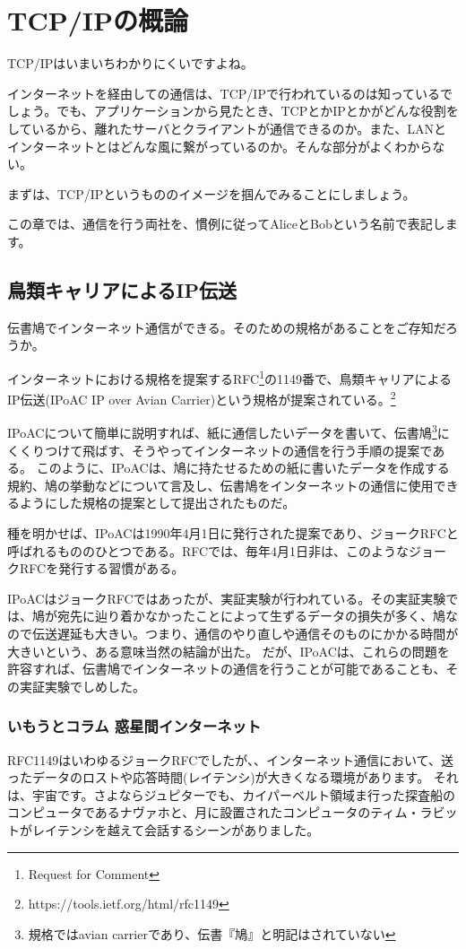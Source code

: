 \chapter{TCP/IPの概論}

TCP/IPはいまいちわかりにくいですよね。

インターネットを経由しての通信は、TCP/IPで行われているのは知っているでしょう。でも、アプリケーションから見たとき、TCPとかIPとかがどんな役割をしているから、離れたサーバとクライアントが通信できるのか。また、LANとインターネットとはどんな風に繋がっているのか。そんな部分がよくわからない。

まずは、TCP/IPというもののイメージを掴んでみることにしましょう。

この章では、通信を行う両社を、慣例に従ってAliceとBobという名前で表記します。

\section{鳥類キャリアによるIP伝送}

伝書鳩でインターネット通信ができる。そのための規格があることをご存知だろうか。

インターネットにおける規格を提案するRFC\footnote{Request for Comment}の1149番で、鳥類キャリアによるIP伝送(IPoAC IP over Avian Carrier)という規格が提案されている。\footnote{https://tools.ietf.org/html/rfc1149}

IPoACについて簡単に説明すれば、紙に通信したいデータを書いて、伝書鳩\footnote{規格ではavian carrierであり、伝書『鳩』と明記はされていない}にくくりつけて飛ばす、そうやってインターネットの通信を行う手順の提案である。
このように、IPoACは、鳩に持たせるための紙に書いたデータを作成する規約、鳩の挙動などについて言及し、伝書鳩をインターネットの通信に使用できるようにした規格の提案として提出されたものだ。

種を明かせば、IPoACは1990年4月1日に発行された提案であり、ジョークRFCと呼ばれるもののひとつである。RFCでは、毎年4月1日非は、このようなジョークRFCを発行する習慣がある。

IPoACはジョークRFCではあったが、実証実験が行われている。その実証実験では、鳩が宛先に辿り着かなかったことによって生ずるデータの損失が多く、鳩なので伝送遅延も大きい。つまり、通信のやり直しや通信そのものにかかる時間が大きいという、ある意味当然の結論が出た。
だが、IPoACは、これらの問題を許容すれば、伝書鳩でインターネットの通信を行うことが可能であることも、その実証実験でしめした。



\subsection*{いもうとコラム 惑星間インターネット}
RFC1149はいわゆるジョークRFCでしたが、、インターネット通信において、送ったデータのロストや応答時間(レイテンシ)が大きくなる環境があります。
それは、宇宙です。さよならジュピターでも、カイパーベルト領域ま行った探査船のコンピュータであるナヴァホと、月に設置されたコンピュータのティム・ラビットがレイテンシを越えて会話するシーンがありました。

